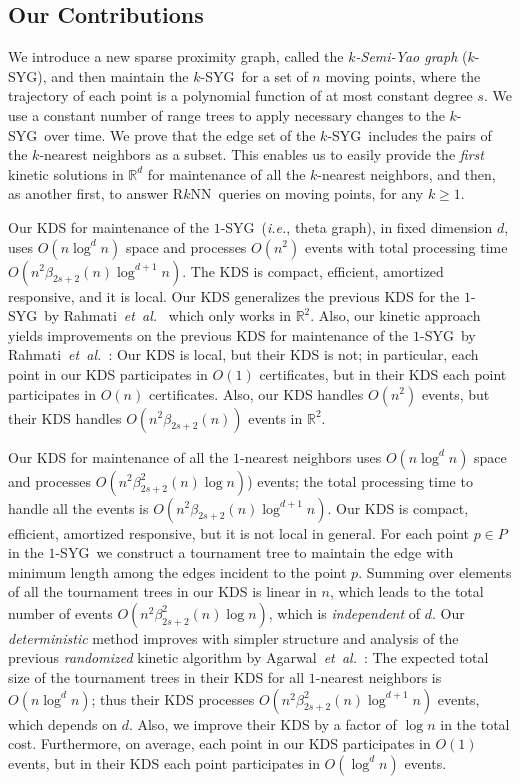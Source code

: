 \documentclass[preprint,12pt]{elsarticle}
\def\rknn{\mbox{R$k$NN}}
\def\ksyg{\mbox{$k$-SYG}}
\def\1syg{\mbox{$1$-SYG}}
\newcommand{\etal}{\emph{et~al.}}
\newcommand{\ie}{\emph{i.e.}}
\begin{document}
\subsection{Our Contributions}\label{sec:Contributions} 
We introduce a new sparse proximity graph, called the \textit{$k$-Semi-Yao graph} (\ksyg), and then maintain the \ksyg~for a set of $n$ moving points, where the trajectory of each point is a polynomial function of at most constant degree $s$. We use a constant number of range trees to apply necessary changes to the \ksyg~over time. We prove that the edge set of the \ksyg~includes the pairs of the $k$-nearest neighbors as a subset. This enables us to easily provide the \textit{first} kinetic solutions in $\mathbb{R}^d$ for maintenance of all the $k$-nearest neighbors, and then, as another first, to answer \rknn~queries on moving points, for any $k\geq 1$.

Our KDS for maintenance of the \1syg~(\ie, theta graph), in fixed dimension $d$, uses $O(n\log^d n)$ space and processes $O(n^2)$ events with total processing time $O(n^2\beta_{2s+2}(n)\log^{d+1} n)$.  The KDS is compact, efficient, amortized responsive, and it is local. Our KDS generalizes the previous KDS for the \1syg~by Rahmati~\etal~\cite{Rahmati2014} which only works in $\mathbb{R}^2$. Also, our kinetic approach yields improvements on the previous KDS for maintenance of the \1syg~by Rahmati~\etal~\cite{Rahmati2014}: Our KDS is local, but their KDS is not;  in particular, each point in our KDS participates in $O(1)$ certificates, but in their KDS each point participates in $O(n)$ certificates. Also, our KDS handles $O(n^2)$ events, but their KDS handles $O(n^2\beta_{2s+2}(n))$ events in $\mathbb{R}^2$.

Our KDS for maintenance of all the $1$-nearest neighbors uses $O(n\log^d n)$ space and processes $O(n^2\beta_{2s+2}^2(n)\log n)$) events; the total processing time to handle all the events is $O(n^2\beta_{2s+2}(n)\log^{d+1} n)$.  Our KDS is compact, efficient, amortized responsive, but it is not local in general. For each point $p\in P$ in the \1syg~we construct a tournament tree to maintain the edge with minimum length among the edges incident to the point $p$. Summing over elements of all the tournament trees in our KDS is linear in $n$, which leads to the total number of events $O(n^2\beta_{2s+2}^2(n)\log n)$, which is \textit{independent} of $d$. Our \textit{deterministic} method improves with simpler structure and analysis of the previous \textit{randomized} kinetic algorithm by Agarwal~\etal~\cite{Agarwal:2008:KDD:1435375.1435379}: The expected total size of the tournament trees in their KDS for all $1$-nearest neighbors is $O(n\log^dn)$; thus their KDS processes $O(n^2\beta_{2s+2}^2(n)\log^{d+1} n)$ events, which depends on $d$. Also, we improve their KDS by a factor of $\log n$ in the total cost. Furthermore, on average, each point in our KDS participates in $O(1)$ events, but in their KDS each point participates in $O(\log^d n)$ events.
\end{document}
